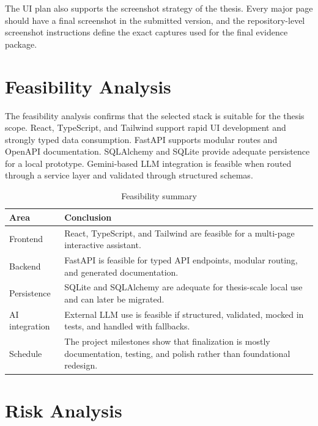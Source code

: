 
The UI plan also supports the screenshot strategy of the thesis. Every major page should have a final screenshot in the submitted version, and the repository-level screenshot instructions define the exact captures used for the final evidence package.

\section{Feasibility Analysis}

The feasibility analysis confirms that the selected stack is suitable for the thesis scope. React, TypeScript, and Tailwind support rapid UI development and strongly typed data consumption. FastAPI supports modular routes and OpenAPI documentation. SQLAlchemy and SQLite provide adequate persistence for a local prototype. Gemini-based LLM integration is feasible when routed through a service layer and validated through structured schemas.

\begin{table}[H]
\centering
\caption{Feasibility summary}
\label{tab:feasibility}
\begin{tabular}{|p{}|p{}|}
\hline
\textbf{Area} & \textbf{Conclusion}\\
\hline
Frontend & React, TypeScript, and Tailwind are feasible for a multi-page interactive assistant.\\
\hline
Backend & FastAPI is feasible for typed API endpoints, modular routing, and generated documentation.\\
\hline
Persistence & SQLite and SQLAlchemy are adequate for thesis-scale local use and can later be migrated.\\
\hline
AI integration & External LLM use is feasible if structured, validated, mocked in tests, and handled with fallbacks.\\
\hline
Schedule & The project milestones show that finalization is mostly documentation, testing, and polish rather than foundational redesign.\\
\hline
\end{tabular}
\end{table}

\section{Risk Analysis}

